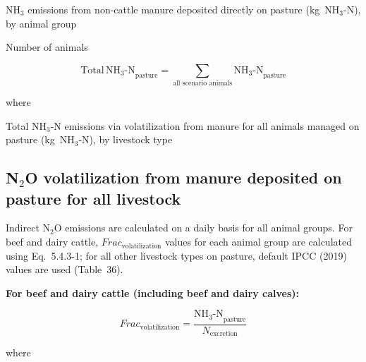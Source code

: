 \begin{description}[font=\normalfont, leftmargin=12em, style=nextline, nosep]
    \item[$\mathrm{NH_3\text{-}N}_{\mathrm{pasture}}$]
        NH$_3$ emissions from non-cattle manure deposited directly on pasture
        (kg~NH$_3$-N), by animal group
    \item[$n_{\mathrm{animals}}$] Number of animals
\end{description}

\begin{equation}
    \mathrm{Total\,NH_3\text{-}N}_{\mathrm{pasture}}
        = \sum_{\text{all scenario animals}} \mathrm{NH_3\text{-}N}_{\mathrm{pasture}}
    \tag{Eq.\ 5.4.2-3}
\end{equation}

\noindent where

\begin{description}[font=\normalfont, leftmargin=12em, style=nextline, nosep]
    \item[$\mathrm{Total\,NH_3\text{-}N}_{\mathrm{pasture}}$]
        Total NH$_3$-N emissions via volatilization from manure for all animals
        managed on pasture (kg~NH$_3$-N), by livestock type
\end{description}

\subsection{N\texorpdfstring{$_2$}{2}O volatilization from manure deposited on pasture for all livestock}
\label{subsec:grazing-volatilization}

Indirect N$_2$O emissions are calculated on a daily basis for all animal groups.
For beef and dairy cattle, $\mathit{Frac}_{\mathrm{volatilization}}$ values for
each animal group are calculated using Eq.~5.4.3-1; for all other livestock
types on pasture, default IPCC (2019) values are used (Table~36).

\bigskip
\noindent\textbf{For beef and dairy cattle (including beef and dairy calves):}

\begin{equation}
    \mathit{Frac}_{\mathrm{volatilization}}
        = \frac{\mathrm{NH_3\text{-}N}_{\mathrm{pasture}}}{N_{\mathrm{excretion}}}
    \tag{Eq.\ 5.4.3-1}
\end{equation}

\noindent where

